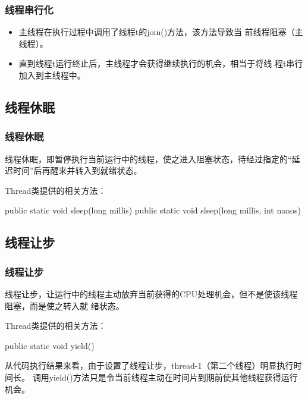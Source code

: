 \begin{frame}[fragile] %
  \frametitle{线程串行化}

  \begin{itemize}
  \item 主线程在执行过程中调用了线程t的join()方法，该方法导致当
    前{\hei\Blue 线程阻塞}（主线程）。
  \item 直到线程t运行终止后，主线程才会获得继续执行的机会，相当于将线
    程t串行加入到主线程中。
  \end{itemize}
\end{frame}

\subsection{线程休眠}

\begin{frame}[fragile] %
\frametitle{线程休眠}

{\hei\Red 线程休眠}，即暂停执行当前运行中的线程，使之进入{\hei\Blue 阻塞状态}，待经过指定的“延
迟时间”后再醒来并转入到{\hei\Blue 就绪状态}。

Thread类提供的相关方法：

\begin{javaCode}
public static void sleep(long millis)
public static void sleep(long millis, int nanos)
\end{javaCode}


\end{frame}

\subsection{线程让步}
\begin{frame}[fragile] %

  \frametitle{线程让步}

  {\hei\Red 线程让步}，让运行中的线程主动放弃当前获得的CPU处理机会，但不是使该线程阻塞，而是使之转入{\hei\Blue 就
  绪状态}。

  Thread类提供的相关方法：

  \begin{javaCode}
    public static void yield()  
  \end{javaCode}

  
  从代码执行结果来看，由于设置了线程让步，thread-1（第二个线程）明显执行时间长。
  调用yield()方法只是令当前线程主动在时间片到期前使其他线程获得运行机会。
  
\end{frame}

